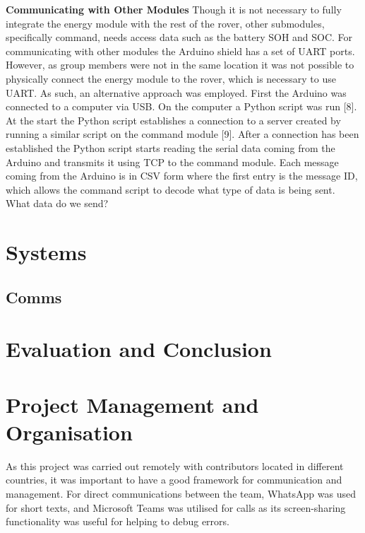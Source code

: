 \documentclass[a4paper]{article}
\begin{document}
\textbf{Communicating with Other Modules}
\vspace{10pt} 
\newline
Though it is not necessary to fully integrate the energy module with the rest of 
the rover, other submodules, specifically command, needs access data such as the 
battery SOH and SOC. For communicating with other modules the Arduino shield has 
a set of UART ports. However, as group members were not in the same location it 
was not possible to physically connect the energy module to the rover, which is 
necessary to use UART. As such, an alternative approach was employed. First the 
Arduino was connected to a computer via USB. On the computer a Python script was 
run [8]. At the start the Python script establishes a connection to a server 
created by running a similar script on the command module [9]. After a 
connection has been established the Python script starts reading the serial data 
coming from the Arduino and transmits it using TCP to the command module. Each 
message coming from the Arduino is in CSV form where the first entry is the 
message ID, which allows the command script to decode what type of data is being 
sent. What data do we send? 










\section{Systems}


\subsection{Comms}




\section{Evaluation and Conclusion}

\section{Project Management and Organisation}
As this project was carried out remotely
with contributors located in different countries, 
it was important to have a good framework for communication and management. 
For direct communications between the team, WhatsApp was used for short texts, 
and Microsoft Teams was utilised for calls as its screen-sharing functionality 
was useful for helping to debug errors. 
\end{document}
